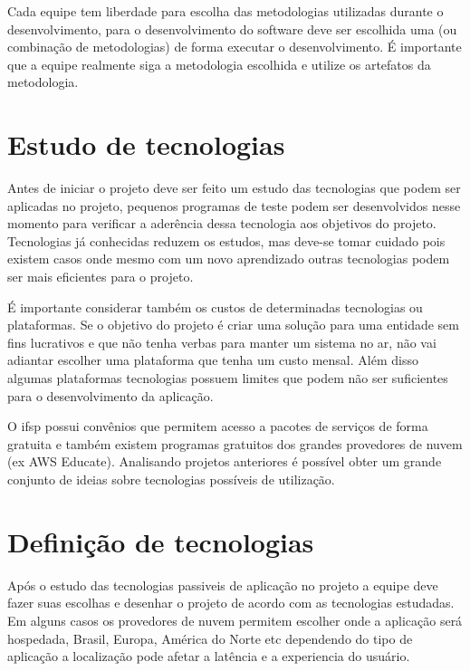 Cada equipe tem liberdade para escolha das metodologias utilizadas durante o desenvolvimento, para o desenvolvimento do software deve ser escolhida uma (ou combinação de metodologias) de forma executar o desenvolvimento. É importante que a equipe realmente siga a metodologia escolhida e utilize os artefatos da metodologia.

\section{Estudo de tecnologias}\label{atv-estudo-tecnologias}

Antes de iniciar o projeto deve ser feito um estudo das tecnologias que podem ser aplicadas no projeto, pequenos programas de teste podem ser desenvolvidos nesse momento para verificar a aderência dessa tecnologia aos objetivos do projeto. Tecnologias já conhecidas reduzem os estudos, mas deve-se tomar cuidado pois existem casos onde mesmo com um novo aprendizado outras tecnologias podem ser mais eficientes para o projeto.

É importante considerar também os custos de determinadas tecnologias ou plataformas. Se o objetivo do projeto é criar uma solução para uma entidade sem fins lucrativos e que não tenha verbas para manter um sistema no ar, não vai adiantar escolher uma plataforma que tenha um custo mensal.
Além disso algumas plataformas tecnologias possuem limites que podem não ser suficientes para o desenvolvimento da aplicação.

O \ac{ifsp} possui convênios que permitem acesso a pacotes de serviços de forma gratuita e também existem programas gratuitos dos grandes provedores de nuvem (ex AWS Educate).
Analisando projetos anteriores  é possível obter um grande conjunto de ideias sobre tecnologias possíveis de utilização. 



\section{Definição de tecnologias}\label{atv-definicao-tecnologias}

Após o estudo das tecnologias passiveis de aplicação no projeto a equipe deve fazer suas escolhas e desenhar o projeto de acordo com as tecnologias estudadas.
Em alguns casos os provedores de nuvem permitem escolher onde a aplicação será hospedada, Brasil, Europa, América do Norte etc dependendo do tipo de aplicação a localização pode afetar a latência e a experiencia do usuário. 

